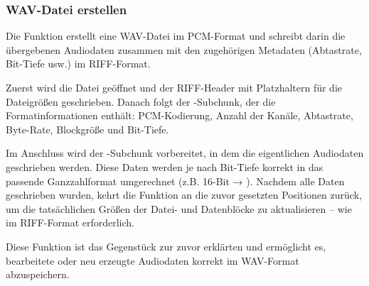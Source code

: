 \subsubsection{WAV-Datei erstellen}

Die Funktion  erstellt eine WAV-Datei im PCM-Format und schreibt darin die übergebenen Audiodaten zusammen mit den zugehörigen Metadaten (Abtastrate, Bit-Tiefe usw.) im RIFF-Format. 

Zuerst wird die Datei geöffnet und der RIFF-Header mit Platzhaltern für die Dateigrößen geschrieben. Danach folgt der -Subchunk, der die Formatinformationen enthält: PCM-Kodierung, Anzahl der Kanäle, Abtastrate, Byte-Rate, Blockgröße und Bit-Tiefe. 

Im Anschluss wird der -Subchunk vorbereitet, in dem die eigentlichen Audiodaten geschrieben werden. Diese Daten werden je nach Bit-Tiefe korrekt in das passende Ganzzahlformat umgerechnet (z.B. 16-Bit → ). Nachdem alle Daten geschrieben wurden, kehrt die Funktion an die zuvor gesetzten Positionen zurück, um die tatsächlichen Größen der Datei- und Datenblöcke zu aktualisieren – wie im RIFF-Format erforderlich. 

Diese Funktion ist das Gegenstück zur zuvor erklärten  und ermöglicht es, bearbeitete oder neu erzeugte Audiodaten korrekt im WAV-Format abzuspeichern. \cite{Hossain:2025} \cite{MathWorks:2025BigDataVideo} \cite{Pfister:2017} \cite{MathWorks:2025SignalToolbox}

